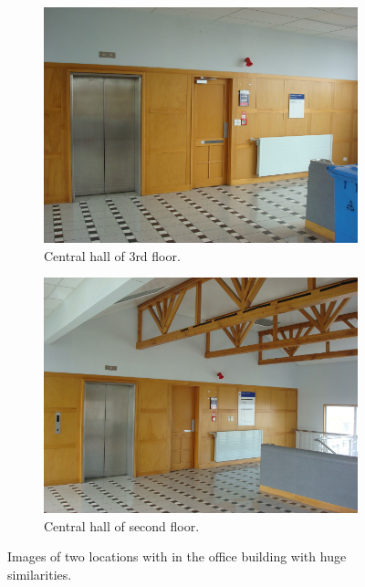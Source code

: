 \begin{figure}[h!]
\centering
        \begin{subfigure}[b]{0.40\textwidth}
                \centering
                \includegraphics[width=\textwidth]{images/indoor.png}
                \caption{Central hall of 3rd floor.}
                \label{fig:sifta}
        \end{subfigure}
        \begin{subfigure}[b]{0.40\textwidth}
                \centering
                \includegraphics[width=\textwidth]{images/indoor1.png}
                \caption{Central hall of second floor.}
                \label{fig:siftb}
        \end{subfigure}
      \caption{Images of two locations with in the office building with huge similarities.}
 \label{fig:sampleindoor} 
\end{figure}


